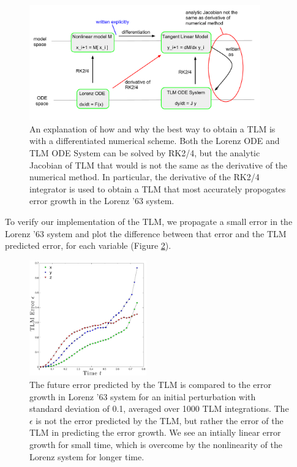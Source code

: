 \documentclass[pre,twocolumn,twoside,byrevtex,superscriptaddress]{revtex4}
\begin{document}
\begin{figure}[h]
  \centering
  \includegraphics[width=0.89\textwidth]{fig13_TLM-explanation.pdf}
  \caption[An explanation of how and why the best way to obtain a TLM is with a differentiated numerical scheme]{
    An explanation of how and why the best way to obtain a TLM is with a differentiated numerical scheme.
    Both the Lorenz ODE and TLM ODE System can be solved by RK2/4, but the analytic Jacobian of TLM that would is not the same as the derivative of the numerical method.
    In particular, the derivative of the RK2/4 integrator is used to obtain a TLM that most accurately propogates error growth in the Lorenz '63 system.
  }
  \label{fig:TLMscheme}
\end{figure}

To verify our implementation of the TLM, we propagate a small error in the Lorenz '63 system and plot the difference between that error and the TLM predicted error, for each variable (Figure \ref{fig:TLMverification}).

\begin{figure}[h]
  \centering
  \includegraphics[width=0.45\textwidth]{fig14_TLM-verification003_noname.pdf}
  \caption[The future error predicted by the TLM is compared to the error growth in Lorenz '63 system for an initial perturbation with standard deviation of 0.1, averaged over 1000 TLM integrations]{
    The future error predicted by the TLM is compared to the error growth in Lorenz '63 system for an initial perturbation with standard deviation of 0.1, averaged over 1000 TLM integrations.
    The $\epsilon$ is not the error predicted by the TLM, but rather the error of the TLM in predicting the error growth.
    We see an intially linear error growth for small time, which is overcome by the nonlinearity of the Lorenz system for longer time.
  }
  \label{fig:TLMverification}
\end{figure}
\end{document}
